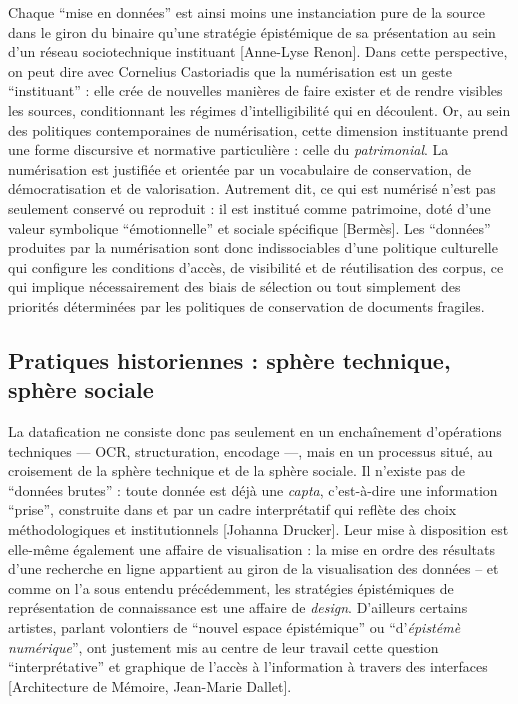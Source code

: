Chaque \enquote{mise en données} est ainsi moins une instanciation pure de la source dans le giron du binaire qu'une stratégie épistémique de sa présentation au sein d’un réseau sociotechnique instituant [Anne-Lyse Renon]. Dans cette perspective, on peut dire avec Cornelius Castoriadis que la numérisation est un geste \enquote{instituant} : elle crée de nouvelles manières de faire exister et de rendre visibles les sources, conditionnant les régimes d’intelligibilité qui en découlent. Or, au sein des politiques contemporaines de numérisation, cette dimension instituante prend une forme discursive et normative particulière : celle du \emph{patrimonial}. La numérisation est justifiée et orientée par un vocabulaire de conservation, de démocratisation et de valorisation. Autrement dit, ce qui est numérisé n’est pas seulement conservé ou reproduit : il est institué comme patrimoine, doté d’une valeur symbolique \enquote{émotionnelle} et sociale spécifique [Bermès]. Les \enquote{données} produites par la numérisation sont donc indissociables d’une politique culturelle qui configure les conditions d’accès, de visibilité et de réutilisation des corpus, ce qui implique nécessairement des biais de sélection ou tout simplement des priorités déterminées par les politiques de conservation de documents fragiles.

\subsection{Pratiques historiennes : sphère technique, sphère sociale}

La datafication ne consiste donc pas seulement en un enchaînement d’opérations techniques — OCR, structuration, encodage —, mais en un processus situé, au croisement de la sphère technique et de la sphère sociale. Il n’existe pas de \enquote{données brutes} : toute donnée est déjà une \emph{capta}, c’est-à-dire une information \enquote{prise}, construite dans et par un cadre interprétatif qui reflète des choix méthodologiques et institutionnels [Johanna Drucker]. Leur mise à disposition est elle-même également une affaire de visualisation : la mise en ordre des résultats d'une recherche en ligne appartient au giron de la visualisation des données -- et comme on l'a sous entendu précédemment, les stratégies épistémiques de représentation de connaissance est une affaire de \emph{design}. D'ailleurs certains artistes, parlant volontiers de \enquote{nouvel espace épistémique} ou \enquote{d'\emph{épistémè numérique}}, ont justement mis au centre de leur travail cette question \enquote{interprétative} et graphique de l'accès à l'information à travers des interfaces [Architecture de Mémoire, Jean-Marie Dallet].

